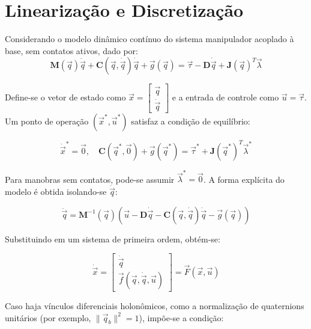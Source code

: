 \section{Linearização e Discretização}
Considerando o modelo dinâmico contínuo do sistema manipulador acoplado à base, sem contatos ativos, dado por:
\begin{equation}
\mathbf{M}(\vec{q})\ddot{\vec{q}} + \mathbf{C}(\vec{q}, \dot{\vec{q}})\dot{\vec{q}} + \vec{g}(\vec{q}) = \vec{\tau} - \mathbf{D} \dot{\vec{q}} + \mathbf{J}(\vec{q})^T \vec{\lambda}
\label{eq:modelo_dinamico}
\end{equation}

Define-se o vetor de estado como $\vec{x} = \begin{bmatrix} \vec{q} \\ \dot{\vec{q}} \end{bmatrix}$ e a entrada de controle como $\vec{u} = \vec{\tau}$. Um ponto de operação $(\vec{x}^*, \vec{u}^*)$ satisfaz a condição de equilíbrio:

\begin{equation}
\dot{\vec{x}}^* = \vec{0}, \quad \mathbf{C}(\vec{q}^*, \vec{0}) + \vec{g}(\vec{q}^*) = \vec{\tau}^* + \mathbf{J}(\vec{q}^*)^T \vec{\lambda}^*
\label{eq:equilibrio}
\end{equation}

Para manobras sem contatos, pode-se assumir $\vec{\lambda}^* = \vec{0}$. A forma explícita do modelo é obtida isolando-se $\ddot{\vec{q}}$:

\begin{equation}
\ddot{\vec{q}} = \mathbf{M}^{-1}(\vec{q})\left( \vec{u} - \mathbf{D} \dot{\vec{q}} - \mathbf{C}(\vec{q}, \dot{\vec{q}})\dot{\vec{q}} - \vec{g}(\vec{q}) \right)
\label{eq:forma_explicita}
\end{equation}

Substituindo em um sistema de primeira ordem, obtém-se:

\begin{equation}
\dot{\vec{x}} = \begin{bmatrix} \dot{\vec{q}} \\ \vec{f}(\vec{q}, \dot{\vec{q}}, \vec{u}) \end{bmatrix} = \vec{F}(\vec{x}, \vec{u})
\label{eq:sistema_estado}
\end{equation}

Caso haja vínculos diferenciais holonômicos, como a normalização de quaternions unitários (por exemplo, $\|\vec{q}_b\|^2 = 1$), impõe-se a condição:

